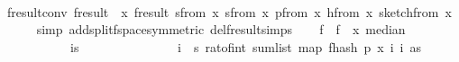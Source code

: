 \begin{isabellebody}
\isanewline
\ \ \isamarkupfalse%
\ f{}{\isacharunderscore}{\kern0pt}result{\isacharunderscore}{\kern0pt}conv{\isacharcolon}{\kern0pt}\ {\isachardoublequoteopen}f{}{\isacharunderscore}{\kern0pt}result\ {\isacharequal}{\kern0pt}\ {\isacharparenleft}{\kern0pt}{\isasymlambda}x{\isachardot}{\kern0pt}\ f{}{\isacharunderscore}{\kern0pt}result\ {\isacharparenleft}{\kern0pt}sfrom\ x{\isacharcomma}{\kern0pt}\ sfrom\ x{\isacharcomma}{\kern0pt}\ p{\isacharunderscore}{\kern0pt}from\ x{\isacharcomma}{\kern0pt}\ h{\isacharunderscore}{\kern0pt}from\ x{\isacharcomma}{\kern0pt}\ sketch{\isacharunderscore}{\kern0pt}from\ x{\isacharparenright}{\kern0pt}{\isacharparenright}{\kern0pt}{\isachardoublequoteclose}\isanewline
\ \ \ \ \isamarkupfalse%
\ {\isacharparenleft}{\kern0pt}simp\ add{\isacharcolon}{\kern0pt}split{\isacharunderscore}{\kern0pt}f{}{\isacharunderscore}{\kern0pt}space{\isacharbrackleft}{\kern0pt}symmetric{\isacharbrackright}{\kern0pt}\ del{\isacharcolon}{\kern0pt}f{}{\isacharunderscore}{\kern0pt}result{\isachardot}{\kern0pt}simps{\isacharparenright}{\kern0pt}\isanewline
\isanewline
\ \ \isamarkupfalse%
\ f\ \ {\isachardoublequoteopen}f\ {\isacharequal}{\kern0pt}\ {\isacharparenleft}{\kern0pt}{\isasymlambda}x{\isachardot}{\kern0pt}\ median\isanewline
\ \ \ \ \ \ \ \ \ \ \ {\isacharparenleft}{\kern0pt}{\isasymlambda}i{\isasymin}{\isacharbraceleft}{\kern0pt}{}{\isachardot}{\kern0pt}{\isachardot}{\kern0pt}{\isacharless}{\kern0pt}s\isanewline
\ \ \ \ \ \ \ \ \ \ \ \ \ \ \ {\isacharparenleft}{\kern0pt}{\isasymSum}i\ {\isacharequal}{\kern0pt}\ {}{\isachardot}{\kern0pt}{\isachardot}{\kern0pt}{\isacharless}{\kern0pt}s\ {\isacharparenleft}{\kern0pt}rat{\isacharunderscore}{\kern0pt}of{\isacharunderscore}{\kern0pt}int\ {\isacharparenleft}{\kern0pt}sum{\isacharunderscore}{\kern0pt}list\ {\isacharparenleft}{\kern0pt}map\ {\isacharparenleft}{\kern0pt}f{}{\isacharunderscore}{\kern0pt}hash\ p\ {\isacharparenleft}{\kern0pt}x\ {\isacharparenleft}{\kern0pt}i\ i{\isacharparenright}{\kern0pt}{\isacharparenright}{\kern0pt}{\isacharparenright}{\kern0pt}\ as{\isacharparenright}{\kern0pt}{\isacharparenright}{\kern0pt}{\isacharparenright}{\kern0pt}\ {\isacharslash}{\kern0pt}\isanewline

\end{isabellebody}
